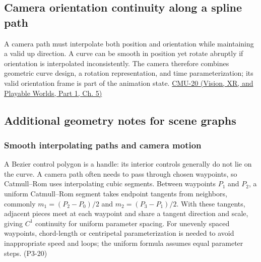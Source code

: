\subsection{Camera orientation continuity along a spline path}\label{04-visual-computing-ii-ch029-camera-orientation-continuity-along-a-spline-path}

\hypertarget{04-visual-computing-ii-ch029-camera-orientation-continuity-along-a-spline-path}{}

A camera path must interpolate both position and orientation while maintaining a valid up direction. A curve can be smooth in position yet rotate abruptly if orientation is interpolated inconsistently. The camera therefore combines geometric curve design, a rotation representation, and time parameterization; its valid orientation frame is part of the animation state. \href{../07-Vision-XR-and-Playable-Worlds-P01/main.pdf\#nameddest=04-visual-computing-ii-ch036-cmu-20---introduction-to-animation}{CMU-20 (Vision, XR, and Playable Worlds, Part 1, Ch. 5)}

\subsection{Additional geometry notes for scene graphs}\label{04-visual-computing-ii-ch029-additional-geometry-notes-for-scene-graphs}

\hypertarget{04-visual-computing-ii-ch029-additional-geometry-notes-for-scene-graphs}{}

\subsubsection{Smooth interpolating paths and camera motion}\label{04-visual-computing-ii-ch029-smooth-interpolating-paths-and-camera-motion}

\hypertarget{04-visual-computing-ii-ch029-smooth-interpolating-paths-and-camera-motion}{}

A Bezier control polygon is a handle: its interior controls generally do not lie on the curve. A camera path often needs to pass through chosen waypoints, so Catmull--Rom uses interpolating cubic segments. Between waypoints \(P_1\) and \(P_2\), a uniform Catmull--Rom segment takes endpoint tangents from neighbors, commonly \(m_1=(P_2-P_0)/2\) and \(m_2=(P_3-P_1)/2\). With these tangents, adjacent pieces meet at each waypoint and share a tangent direction and scale, giving \(C^1\) continuity for uniform parameter spacing. For unevenly spaced waypoints, chord-length or centripetal parameterization is needed to avoid inappropriate speed and loops; the uniform formula assumes equal parameter steps. (P3-20)

